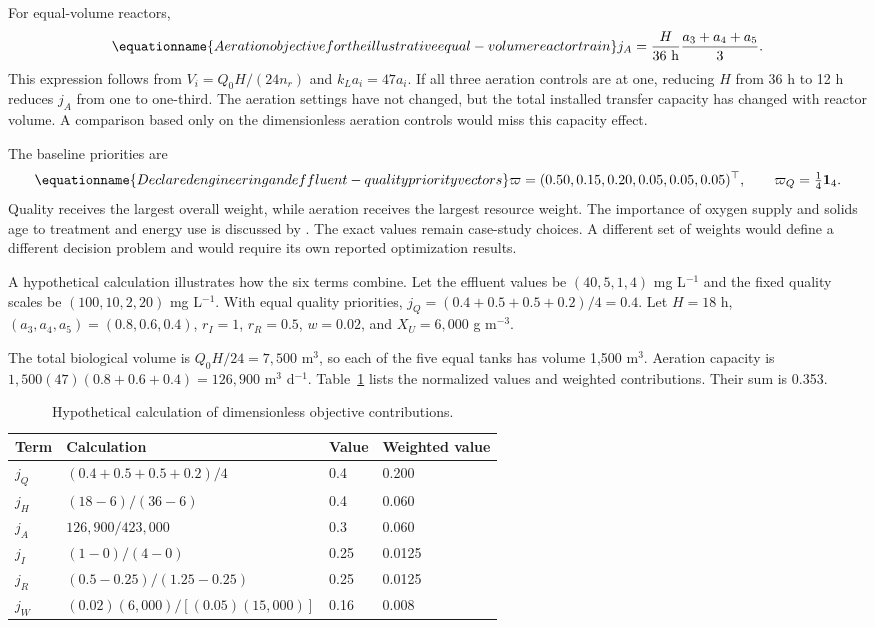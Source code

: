 For equal-volume reactors,
\begin{equation}
\equationname{Aeration objective for the illustrative equal-volume reactor train}
j_A=\frac{H}{36\ \mathrm{h}}\frac{a_3+a_4+a_5}{3}.
\label{eq:plant_aeration_proxy_example}
\end{equation}
This expression follows from $V_i=Q_0H/(24n_r)$ and $k_La_i=47a_i$. If all three aeration controls are at one, reducing $H$ from 36 h to 12 h reduces $j_A$ from one to one-third. The aeration settings have not changed, but the total installed transfer capacity has changed with reactor volume. A comparison based only on the dimensionless aeration controls would miss this capacity effect.

The baseline priorities are
\begin{equation}
\equationname{Declared engineering and effluent-quality priority vectors}
\varpi=(0.50,0.15,0.20,0.05,0.05,0.05)^\top,\qquad
\varpi_Q=\tfrac14\mathbf1_4.
\label{eq:plant_objective_priorities}
\end{equation}
Quality receives the largest overall weight, while aeration receives the largest resource weight. The importance of oxygen supply and solids age to treatment and energy use is discussed by \citet{Leu2012}. The exact values remain case-study choices. A different set of weights would define a different decision problem and would require its own reported optimization results.

A hypothetical calculation illustrates how the six terms combine. Let the effluent values be $(40,5,1,4)$ mg L$^{-1}$ and the fixed quality scales be $(100,10,2,20)$ mg L$^{-1}$. With equal quality priorities, $j_Q=(0.4+0.5+0.5+0.2)/4=0.4$. Let $H=18$ h, $(a_3,a_4,a_5)=(0.8,0.6,0.4)$, $r_I=1$, $r_R=0.5$, $w=0.02$, and $X_U=6{,}000$ g m$^{-3}$.

The total biological volume is $Q_0H/24=7{,}500$ m$^3$, so each of the five equal tanks has volume 1{,}500 m$^3$. Aeration capacity is $1{,}500(47)(0.8+0.6+0.4)=126{,}900$ m$^3$ d$^{-1}$. Table~\ref{tab:plant_hypothetical_objective} lists the normalized values and weighted contributions. Their sum is 0.353.

\begin{table}[htbp]
\centering\small
\caption{Hypothetical calculation of dimensionless objective contributions.}
\label{tab:plant_hypothetical_objective}
\begin{tabular}{llll}
\toprule Term & Calculation & Value & Weighted value\\\midrule
$j_Q$ & $(0.4+0.5+0.5+0.2)/4$ & 0.4 & 0.200\\
$j_H$ & $(18-6)/(36-6)$ & 0.4 & 0.060\\
$j_A$ & $126{,}900/423{,}000$ & 0.3 & 0.060\\
$j_I$ & $(1-0)/(4-0)$ & 0.25 & 0.0125\\
$j_R$ & $(0.5-0.25)/(1.25-0.25)$ & 0.25 & 0.0125\\
$j_W$ & $(0.02)(6{,}000)/[(0.05)(15{,}000)]$ & 0.16 & 0.008\\
\bottomrule
\end{tabular}
\end{table}


